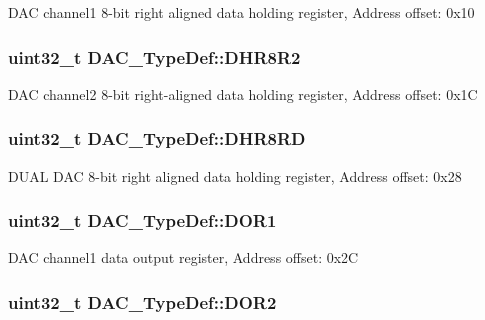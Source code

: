 D\-A\-C channel1 8-\/bit right aligned data holding register, Address offset\-: 0x10 \hypertarget{struct_d_a_c___type_def_a3b096b71656f8fb32cd18b4c8b1d2334}{
\subsubsection[{D\-H\-R8\-R2}]{ uint32\-\_\-t D\-A\-C\-\_\-\-Type\-Def\-::\-D\-H\-R8\-R2}}\label{struct_d_a_c___type_def_a3b096b71656f8fb32cd18b4c8b1d2334}
D\-A\-C channel2 8-\/bit right-\/aligned data holding register, Address offset\-: 0x1\-C \hypertarget{struct_d_a_c___type_def_a03f8d95bbf0ce3a53cb79506d5bf995a}{
\subsubsection[{D\-H\-R8\-R\-D}]{ uint32\-\_\-t D\-A\-C\-\_\-\-Type\-Def\-::\-D\-H\-R8\-R\-D}}\label{struct_d_a_c___type_def_a03f8d95bbf0ce3a53cb79506d5bf995a}
D\-U\-A\-L D\-A\-C 8-\/bit right aligned data holding register, Address offset\-: 0x28 \hypertarget{struct_d_a_c___type_def_a50b4f0b0d2a376f729c8d7acf47864c3}{
\subsubsection[{D\-O\-R1}]{ uint32\-\_\-t D\-A\-C\-\_\-\-Type\-Def\-::\-D\-O\-R1}}\label{struct_d_a_c___type_def_a50b4f0b0d2a376f729c8d7acf47864c3}
D\-A\-C channel1 data output register, Address offset\-: 0x2\-C \hypertarget{struct_d_a_c___type_def_a1bde8391647d6422b39ab5ba4f13848b}{
\subsubsection[{D\-O\-R2}]{ uint32\-\_\-t D\-A\-C\-\_\-\-Type\-Def\-::\-D\-O\-R2}}\label{struct_d_a_c___type_def_a1bde8391647d6422b39ab5ba4f13848b}
